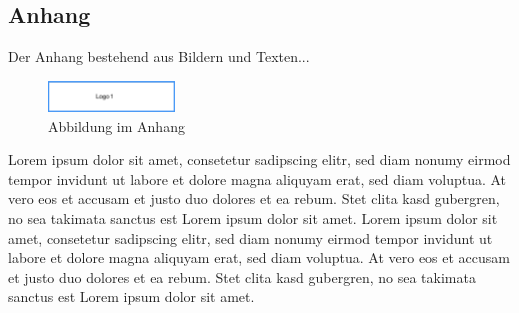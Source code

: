 \subsection*{Anhang}\label{anhang}

Der Anhang bestehend aus Bildern und Texten...

\begin{figure}[htb]
 \centering
 \includegraphics[width=0.3\textwidth,angle=0]{abb/logo1}
 \caption[Abbildung im Anhang]{Abbildung im Anhang}
\label{fig:Abbildung im Anhang}
\end{figure}

Lorem ipsum dolor sit amet, consetetur sadipscing elitr, sed diam nonumy eirmod tempor invidunt ut labore et dolore magna aliquyam erat, sed diam voluptua. At vero eos et accusam et justo duo dolores et ea rebum. Stet clita kasd gubergren, no sea takimata sanctus est Lorem ipsum dolor sit amet. Lorem ipsum dolor sit amet, consetetur sadipscing elitr, sed diam nonumy eirmod tempor invidunt ut labore et dolore magna aliquyam erat, sed diam voluptua. At vero eos et accusam et justo duo dolores et ea rebum. Stet clita kasd gubergren, no sea takimata sanctus est Lorem ipsum dolor sit amet.
